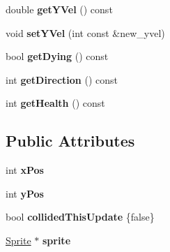 \begin{DoxyCompactItemize}
\item 
\hypertarget{class_game_object_adee1a9a33c76236c072f22e6049e9985}{}double {\bfseries get\+Y\+Vel} () const \label{class_game_object_adee1a9a33c76236c072f22e6049e9985}

\item 
\hypertarget{class_game_object_a661db91109a8ef1a97c2aab8e65b063b}{}void {\bfseries set\+Y\+Vel} (int const \&new\+\_\+yvel)\label{class_game_object_a661db91109a8ef1a97c2aab8e65b063b}

\item 
\hypertarget{class_game_object_ace6182e9f11f78c860309e80c02f02a4}{}bool {\bfseries get\+Dying} () const \label{class_game_object_ace6182e9f11f78c860309e80c02f02a4}

\item 
\hypertarget{class_game_object_a7f5572a077957d6f96d45d70d9b24880}{}int {\bfseries get\+Direction} () const \label{class_game_object_a7f5572a077957d6f96d45d70d9b24880}

\item 
\hypertarget{class_game_object_ad46ad4ff6ddd72d309d6fbbcd8805e30}{}int {\bfseries get\+Health} () const \label{class_game_object_ad46ad4ff6ddd72d309d6fbbcd8805e30}

\end{DoxyCompactItemize}
\subsection*{Public Attributes}
\begin{DoxyCompactItemize}
\item 
\hypertarget{class_game_object_a7064902ef403216ffe8ec2503a5b70bb}{}int {\bfseries x\+Pos}\label{class_game_object_a7064902ef403216ffe8ec2503a5b70bb}

\item 
\hypertarget{class_game_object_a6e409956cceec4c73d33564a6c30f18d}{}int {\bfseries y\+Pos}\label{class_game_object_a6e409956cceec4c73d33564a6c30f18d}

\item 
\hypertarget{class_game_object_aa1e23b643890c0bdc3b6d8512bb3422c}{}bool {\bfseries collided\+This\+Update} \{false\}\label{class_game_object_aa1e23b643890c0bdc3b6d8512bb3422c}

\item 
\hypertarget{class_game_object_a00fecd21a33c990c4132f6f8e886135f}{}\hyperlink{class_sprite}{Sprite} $\ast$ {\bfseries sprite}\label{class_game_object_a00fecd21a33c990c4132f6f8e886135f}

\end{DoxyCompactItemize}
